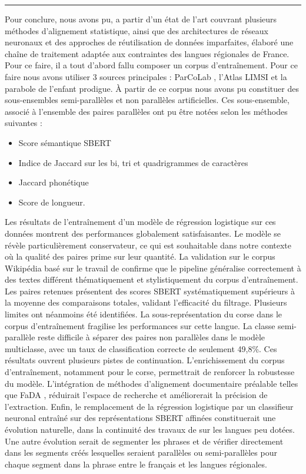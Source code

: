 \noindent\rule{\textwidth}{0.4pt}

Pour conclure, nous avons pu, a partir d'un état de l'art couvrant plusieurs méthodes d'alignement statistique,
ainsi que des architectures de réseaux neuronaux et des approches de réutilisation de données imparfaites, élaboré une chaîne de 
traitement adaptée aux contraintes des langues régionales de France. Pour ce faire, il a tout d'abord fallu composer un corpus d'entraînement.
Pour ce faire nous avons utiliser 3 sources principales{ :} ParCoLab \citep{stosic_2024}, 
l'Atlas LIMSI et la parabole de l'enfant prodigue. À partir de ce corpus nous avons pu constituer des sous-ensembles semi-parallèles et
non parallèles artificielles. Ces sous-ensemble, associé à l'ensemble des paires parallèles ont pu être notées selon les méthodes suivantes{ :}
\begin{itemize}
    \item Score sémantique SBERT
    \item Indice de Jaccard sur les bi, tri et quadrigrammes de caractères
    \item Jaccard phonétique
    \item Score de longueur.
\end{itemize}

Les résultats de l'entraînement d'un modèle de régression logistique sur ces données montrent des performances globalement satisfaisantes.
Le modèle se révèle particulièrement conservateur, ce qui est souhaitable dans notre
contexte où la qualité des paires prime sur leur quantité. La validation sur le corpus Wikipédia basé sur le travail de \citet{tsolakis_2024}
confirme que le pipeline généralise
correctement à des textes différent thématiquement et stylistiquement du corpus d'entraînement. Les paires retenues
présentent des scores SBERT systématiquement supérieurs à la moyenne des comparaisons totales, validant l'efficacité du filtrage.
Plusieurs limites ont néanmoins été identifiées. La sous-représentation du corse dans le corpus d'entraînement fragilise les performances sur
cette langue. La classe semi-parallèle reste difficile à séparer des paires non parallèles dans le modèle
multiclasse, avec un taux de classification correcte de seulement 49,8\%.
Ces résultats ouvrent plusieurs pistes de continuation. L'enrichissement du corpus d'entraînement, notamment pour le corse, permettrait de
renforcer la robustesse du modèle. L'intégration de méthodes d'alignement documentaire préalable telles que FaDA \citet{tsolakis_2024},
réduirait l'espace de recherche
et améliorerait la précision de l'extraction. Enfin, le remplacement de la régression logistique par un classifieur neuronal entraîné sur des
représentations SBERT affinées constituerait une évolution naturelle, dans la continuité des travaux de \citet{tan_2022} sur les
langues peu dotées. Une autre évolution serait de segmenter les phrases et de vérifier directement dans les segments créés lesquelles seraient
parallèles ou semi-parallèles pour chaque segment dans la phrase entre le français et les langues régionales.
